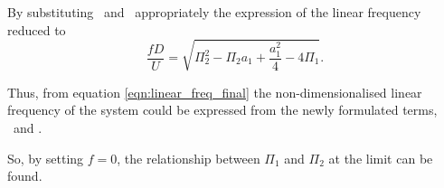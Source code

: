 By substituting \massstiff\ and \massdamp\ appropriately the expression of the linear frequency reduced to   
\begin{equation}
\label{eqn:linear_freq_final}
\frac{fD}{U} = \sqrt{\Pi_2^2 - \Pi_2a_1 + \frac{a_1^2}{4} - 4\Pi_1}.
\end{equation}

Thus, from equation \ref{eqn:linear_freq_final} the non-dimensionalised linear frequency of the system could be expressed from the newly formulated terms, \massstiff\ and \massdamp.



So, by setting $f=0$, the relationship between $\Pi_1$ and $\Pi_2$ at
the limit can be found.






%
%	
%	




